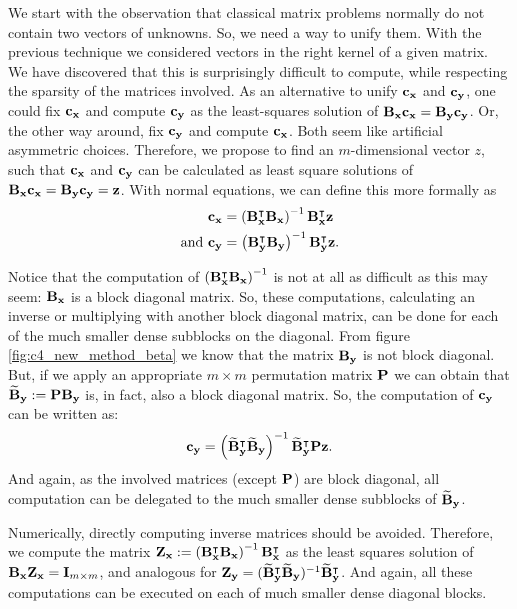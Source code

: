 We start with the observation that classical matrix problems normally do not contain two vectors of unknowns. So, we need a way to unify them. With the previous technique we considered vectors in the right kernel of a given matrix. We have discovered that this is surprisingly difficult to compute, while respecting the sparsity of the matrices involved. As an alternative to unify $\vb{c_x}$ and $\vb{c_y}$, one could fix $\vb{c_x}$ and compute $\vb{c_y}$ as the least-squares solution of $\vb{B_x}\vb{c_x} = \vb{B_y}\vb{c_y}$. Or, the other way around, fix $\vb{c_y}$ and compute $\vb{c_x}$. Both seem like artificial asymmetric choices. Therefore, we propose to find an $m$-dimensional vector $z$, such that $\vb{c_x}$ and $\vb{c_y}$ can be calculated as least square solutions of $\vb{B_x}\vb{c_x} = \vb{B_y}\vb{c_y} = \vb{z}$. With normal equations, we can define this more formally as
\begin{align*}
    \vb{c_x}            & = \left(\vb{B_x^\intercal} \vb{B_x}\right)^{-1} \vb{B_x^\intercal} \vb{z}          \\
    \text{and }\vb{c_y} & = \left(\vb{B_y^\intercal} \vb{B_y}\right)^{-1} \vb{B_y^\intercal} \vb{z} \text{.}
\end{align*}

Notice that the computation of $\left(\vb{B_x^\intercal} \vb{B_x}\right)^{-1}$ is not at all as difficult as this may seem: $\vb{B_x}$ is a block diagonal matrix. So, these computations, calculating an inverse or multiplying with another block diagonal matrix, can be done for each of the much smaller dense subblocks on the diagonal. From figure \ref{fig:c4_new_method_beta} we know that the matrix $\vb{B_y}$ is not block diagonal. But, if we apply an appropriate $m \times m$ permutation matrix $\vb{P}$ we can obtain that $\vb{\widetilde{B}_y} := \vb{P} \vb{B_y}$ is, in fact, also a block diagonal matrix. So, the computation of $\vb{c_y}$ can be written as:
$$
    \vb{c_y} = \left(\vb{\widetilde{B}_y^\intercal} \vb{\widetilde{B}_y}\right)^{-1} \vb{\widetilde{B}^\intercal_y} \vb{P} \vb{z} \text{.}
$$
And again, as the involved matrices (except $\vb{P}$) are block diagonal, all computation can be delegated to the much smaller dense subblocks of $\vb{\widetilde{B}_y}$.

Numerically, directly computing inverse matrices should be avoided. Therefore, we compute the matrix $\vb{Z_x} := \left(\vb{B_x^\intercal} \vb{B_x}\right)^{-1} \vb{B_x^\intercal}$ as the least squares solution of $\vb{B_x} \vb{Z_x} = \vb{I}_{m \times m}$, and analogous for $\vb{Z_y} = (\vb{\widetilde{B}_y^\intercal} \vb{\widetilde{B}_y})^{-1} \vb{\widetilde{B}^\intercal_y}$. And again, all these computations can be executed on each of much smaller dense diagonal blocks.

